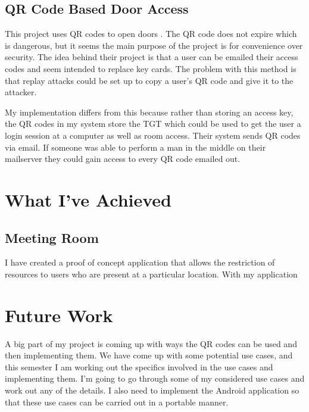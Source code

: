\documentclass[]{report}   %
\begin{document}
\subsection{QR Code Based Door Access}
This project uses QR codes to open doors \cite{QRRelated}. The QR code does not expire which is dangerous, but it seems the main purpose of the project is for convenience over security. The idea behind their project is that a user can be emailed their access codes and seem intended to replace key cards. The problem with this method is that replay attacks could be set up to copy a user's QR code and give it to the attacker.

My implementation differs from this because rather than storing an access key, the QR codes in my system store the TGT which could be used to get the user a login session at a computer as well as room access. Their system sends QR codes via email. If someone was able to perform a man in the middle on their mailserver they could gain access to every QR code emailed out.

\section{What I've Achieved}
\subsection{Meeting Room}
I have created a proof of concept application that allows the restriction of resources to users who are present at a particular location. With my application 



\section{Future Work}
A big part of my project is coming up with ways the QR codes can be used and then implementing them. We have come up with some potential use cases, and this semester I am working out the specifics involved in the use cases and implementing them. I’m going to go through some of my considered use cases and work out any of the details. I also need to implement the Android application so that these use cases can be carried out in a portable manner.
\end{document}
